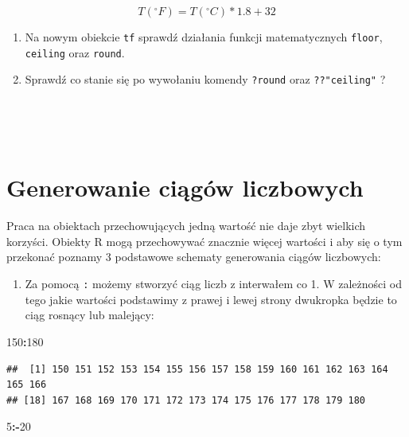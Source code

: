 \documentclass[]{book}
\newenvironment{Shaded}{\begin{snugshade}}{\end{snugshade}}
\newcommand{\DecValTok}[1]{\textcolor[rgb]{0.00,0.00,0.81}{#1}}
\newcommand{\OperatorTok}[1]{\textcolor[rgb]{0.81,0.36,0.00}{\textbf{#1}}}
\providecommand{\tightlist}{%
  \setlength{\itemsep}{0pt}\setlength{\parskip}{0pt}}
\theoremstyle{definition}
\theoremstyle{definition}
\theoremstyle{definition}
\theoremstyle{remark}
\begin{document}
\begin{equation} 
  T(^\circ F) = T(^\circ C) * 1.8 + 32
  \label{eq:konwersja2}
\end{equation}

\begin{enumerate}
\def\labelenumi{\arabic{enumi}.}
\setcounter{enumi}{1}
\item
  Na nowym obiekcie \texttt{tf} sprawdź działania funkcji matematycznych
  \texttt{floor}, \texttt{ceiling} oraz \texttt{round}.
\item
  Sprawdź co stanie się po wywołaniu komendy \texttt{?round} oraz
  \texttt{??"ceiling"} ?
\end{enumerate}

~

~

\section{Generowanie ciągów
liczbowych}\label{generowanie-ciagow-liczbowych}

Praca na obiektach przechowujących jedną wartość nie daje zbyt wielkich
korzyści. Obiekty R mogą przechowywać znacznie więcej wartości i aby się
o tym przekonać poznamy 3 podstawowe schematy generowania ciągów
liczbowych:

\begin{enumerate}
\def\labelenumi{\arabic{enumi}.}
\tightlist
\item
  Za pomocą \texttt{:} możemy stworzyć ciąg liczb z interwałem co 1. W
  zależności od tego jakie wartości podstawimy z prawej i lewej strony
  dwukropka będzie to ciąg rosnący lub malejący:
\end{enumerate}

\begin{Shaded}
\begin{Highlighting}[]
\DecValTok{150}\OperatorTok{:}\DecValTok{180}
\end{Highlighting}
\end{Shaded}

\begin{verbatim}
##  [1] 150 151 152 153 154 155 156 157 158 159 160 161 162 163 164 165 166
## [18] 167 168 169 170 171 172 173 174 175 176 177 178 179 180
\end{verbatim}

\begin{Shaded}
\begin{Highlighting}[]
\DecValTok{5}\OperatorTok{:-}\DecValTok{20}
\end{Highlighting}
\end{Shaded}
\end{document}

